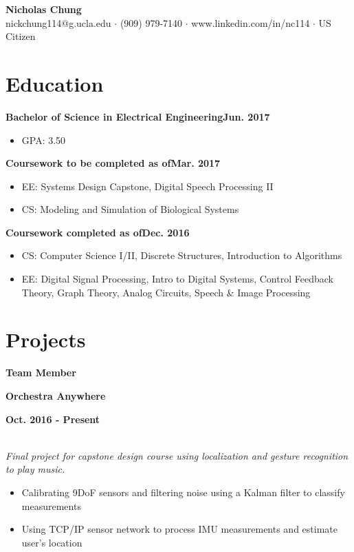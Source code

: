 \documentclass[12pt]{article}
\newcommand\textbox[1]{\parbox{.333\textwidth}{#1}}
\newcommand{\textlcr}[3]{\textbox{\textbf{#1}\hfill}\textbox{\hfil \textbf{#2}\hfil}\textbox{\hfill \textbf{#3}}}
\begin{document}
\begin{center}
	\textbf{\LARGE Nicholas Chung} \\ \vspace{.5ex}
	nickchung114@g.ucla.edu $\cdot$ (909) 979-7140 $\cdot$ www.linkedin.com/in/nc114 $\cdot$ US Citizen
\end{center}

\vspace{-8pt}
\smallskip
\section*{Education}
\vspace*{-1em}\makebox[\linewidth]{\rule{\textwidth}{0.4pt}}

\textbf{Bachelor of Science in Electrical Engineering}\hfill\textbf{Jun. 2017}
\begin{itemize}
\item GPA: 3.50
\end{itemize}

\textbf{Coursework to be completed as of}\hfill\textbf{Mar. 2017}
\begin{itemize}
\item EE: Systems Design Capstone, Digital Speech Processing II
\item CS: Modeling and Simulation of Biological Systems
\end{itemize}

\textbf{Coursework completed as of}\hfill\textbf{Dec. 2016}
\begin{itemize}
\item CS: Computer Science I/II, Discrete Structures, Introduction to Algorithms
\item EE: Digital Signal Processing, Intro to Digital Systems, Control Feedback Theory, Graph Theory, Analog Circuits,  Speech \& Image Processing
\end{itemize}

\section*{Projects}
\vspace*{-1em}\makebox[\linewidth]{\rule{\textwidth}{0.4pt}}

\textlcr{Team Member}{Orchestra Anywhere}{Oct. 2016 - Present}
\\ \textit{Final project for capstone design course using localization and gesture recognition to play music.}
\begin{itemize}
\item Calibrating 9DoF sensors and filtering noise using a Kalman filter to classify measurements
\item Using TCP/IP sensor network to process IMU measurements and estimate user's location
\end{itemize}
\end{document}
